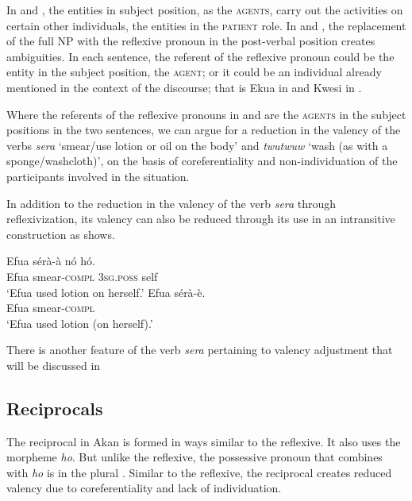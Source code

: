 \documentclass[output=paper]{langsci/langscibook}
\begin{document}
In  and , the entities in subject position, as the \textsc{agents}, carry out the activities on certain other individuals, the entities in the \textsc{patient} role. In  and , the replacement of the full NP with the reflexive pronoun in the post-verbal position creates ambiguities. In each sentence, the referent of the reflexive pronoun could be the entity in the subject position, the \textsc{agent}; or it could be an individual already mentioned in the context of the discourse; that is Ekua in  and Kwesi in .

Where the referents of the reflexive pronouns in  and  are the \textsc{agents} in the subject positions in the two sentences, we can argue for a reduction in the valency of the verbs \textit{sera} `smear/use lotion or oil on the body' and \textit{twutwuw} `wash (as with a sponge/washcloth)', on the basis of coreferentiality and non-individuation of the participants involved in the situation. 

In addition to the reduction in the valency of the verb \textit{sera} through reflexivization, its valency can also be reduced through its use in an intransitive construction as  shows.

\ea\label{ex:31.osam}
\ea\label{ex:31a.osam}
\gll  Efua  sérà-à    nó    hó.\\
       Efua  smear-\textsc{compl}  \textsc{3sg.poss}  self\\
\glt   `Efua used lotion on herself.'
\ex\label{ex:31b.osam}
\gll Efua  sérà-è.\\
       Efua  smear-\textsc{compl}\\
\glt   `Efua used lotion (on herself).'
\z 
\z 


There is another feature of the verb \textit{sera} pertaining to valency adjustment that will be discussed in 

\subsection{Reciprocals}\label{§4.2:reciprocals.osam}

The reciprocal in Akan is formed in ways similar to the reflexive. It also uses the morpheme \textit{ho}. But unlike the reflexive, the possessive pronoun that combines with \textit{ho} is in the plural . Similar to the reflexive, the reciprocal creates reduced valency due to coreferentiality and lack of individuation.
\end{document}
